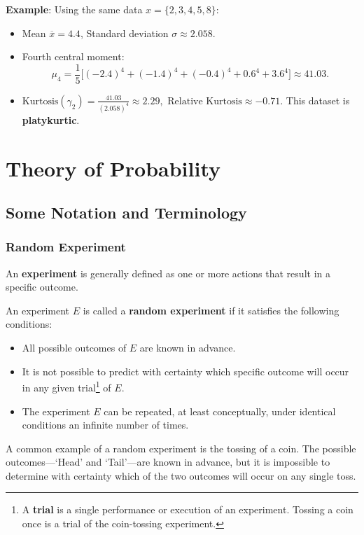 \documentclass[twoside]{book}
\begin{document}
\textbf{Example}: Using the same data \(x = \{2,3,4,5,8\}\):
\begin{itemize}
  \item Mean \(\overline{x}=4.4\), \quad Standard deviation \(\sigma\approx2.058\).
  \item Fourth central moment:
    \[
    \mu_4 = \frac{1}{5}\bigl[(-2.4)^4 + (-1.4)^4 + (-0.4)^4 + 0.6^4 + 3.6^4\bigr]
           \approx 41.03.
    \]
  \item \(\displaystyle \text{Kurtosis} (\gamma_2) = \frac{41.03}{(2.058)^4}\approx 2.29,\)
        \(\text{Relative Kurtosis}\approx -0.71\).  
        This dataset is \textbf{platykurtic}.
\end{itemize}


\chapter{Theory of Probability}
\section{Some Notation and Terminology}
\subsection{Random Experiment}

An \textbf{experiment} is generally defined as one or more actions that result in a specific outcome. 

\begin{textbox}
An experiment $E$ is called a \textbf{random experiment} if it satisfies the following conditions:

\begin{itemize}
    \item All possible outcomes of $E$ are known in advance.
    \item It is not possible to predict with certainty which specific outcome will occur in any given trial\footnote{A \textbf{trial} is a single performance or execution of an experiment. Tossing a coin once is a trial of the coin-tossing experiment.} of $E$.
    \item The experiment $E$ can be repeated, at least conceptually, under identical conditions an infinite number of times.
\end{itemize}
\end{textbox}

A common example of a random experiment is the tossing of a coin. The possible outcomes—`Head' and `Tail'—are known in advance, but it is impossible to determine with certainty which of the two outcomes will occur on any single toss.
\end{document}
